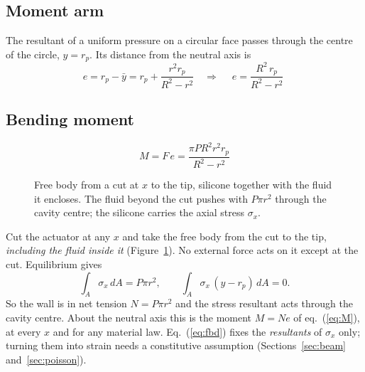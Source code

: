 \documentclass[11pt,a4paper]{article}
\numberwithin{equation}{section}
\newcommand{\rp}{r_p}
\begin{document}
\subsection{Moment arm}
The resultant of a uniform pressure on a circular face passes through the centre of the circle, $y=\rp$.
Its distance from the neutral axis is
\begin{equation}
e = \rp - \bar y = \rp + \frac{r^2\rp}{R^2-r^2}
\quad\Longrightarrow\quad
\boxed{\;e = \frac{R^2\,\rp}{R^2-r^2}\;} \label{eq:e}
\end{equation}

\subsection{Bending moment}
\begin{equation}
\boxed{\;M = F\,e = \frac{\pi P R^2 r^2 \rp}{R^2-r^2}\;} \label{eq:M}
\end{equation}

\begin{figure}[H]
\centering
{}
\caption{Free body from a cut at $x$ to the tip, silicone together with the fluid it encloses. The fluid beyond the cut
pushes with $P\pi r^2$ through the cavity centre; the silicone carries the axial stress $\sigma_x$.}
\label{fig:fbd}
\end{figure}

\begin{remark}
Cut the actuator at any $x$ and take the free body from the cut to the tip, \emph{including the fluid inside it}
(Figure~\ref{fig:fbd}). No external force acts on it except at the cut. Equilibrium gives
\begin{equation}
\int_A \sigma_x\,dA = P\pi r^2 ,\qquad \int_A \sigma_x\,(y-\rp)\,dA = 0 . \label{eq:fbd}
\end{equation}
So the wall is in net tension $N=P\pi r^2$ and the stress resultant acts through the cavity centre. About the neutral axis this
is the moment $M = N e$ of eq.~(\ref{eq:M}), at every $x$ and for any material law.
Eq.~(\ref{eq:fbd}) fixes the \emph{resultants} of $\sigma_x$ only; turning them into strain needs a constitutive assumption (Sections~\ref{sec:beam} and~\ref{sec:poisson}).
\end{remark}
\end{document}
